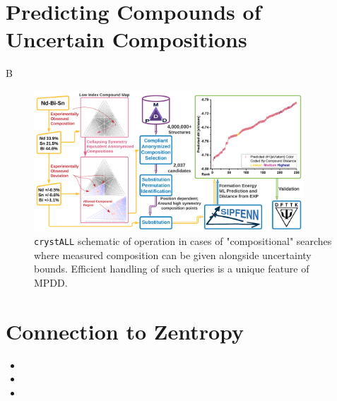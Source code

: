 \section{Predicting Compounds of Uncertain Compositions} \label{sec:crystallcompositional}

B

\begin{figure}[h]
    \centering
    \includegraphics[width=0.9\textwidth]{crystall/crystALL_composition_diagram_V3.png}
    \caption{\texttt{crystALL} schematic of operation in cases of "compositional" searches where measured composition can be given alongside uncertainty bounds. Efficient handling of such queries is a unique feature of MPDD.}
    \label{fig:crystallcomposition}
\end{figure}

\section{Connection to Zentropy} \label{sec:crystallzentropy}

\begin{itemize}
    \item 
    \item
    \item
\end{itemize}


\printbibliography[heading=subbibintoc]
